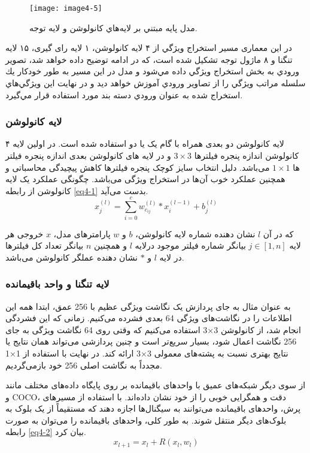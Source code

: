\begin{figure}[h]
\centering
  \texttt{[image: image4-5]}
  \caption{مدل پايه مبتني بر لايه‌هاي كانولوشن و لايه توجه.}
  \label{image4-5}
\end{figure}

\noindent
در این معماری مسير استخراج ويژگي از ۴ لايه كانولوشن، ۱ لایه رای گیری، ۱۵ لايه تنگنا   و ۸ ماژول توجه  تشکیل شده است، كه در ادامه توضيح داده خواهد شد، تصوير ورودي به بخش استخراج ويژگي داده مي‌شود و مدل در اين مسير به طور خودكار يك سلسله مراتب ويژگي را از تصاوير ورودي آموزش خواهد ديد و در نهايت اين ويژگي‌هاي استخراج شده به عنوان ورودي دسته بند مورد استفاده قرار مي‌گيرد.

\subsubsection{لايه كانولوشن}
۴ لایه کانولوشن دو بعدی همراه با گام یک یا دو استفاده شده است. در اولین لایه کانولوشن‌ اندازه پنجره فیلترها $3 \times 3$ و در لایه های کانولوشن بعدی اندازه پنجره فیلتر ها $1 \times 1$ می‌باشد. دلیل انتخاب سایز کوچک پنجره فیلترها کاهش پیچیدگی محاسباتی و همچنین عملکرد خوب آن‌ها در استخراج ویژگی می‌باشد. چگونگی عملکرد یک لایه کانولوشن از رابطه \ref{eq4-1} بدست می‌آید.
\begin{equation}	
x_j^{(l)} =\sum_{i=0}^{c} w_{c_{ij}}^{(l)}\ast x_i^{(l-1) }+ b_j^{(l)} 
\label{eq4-1}
\end{equation}

\noindent
که در آن $l$ نشان دهنده شماره لایه کانولوشن، $b$ و $w$ پارامترهای مدل، $x$ خروجی هر لایه $j\in[1,n]$ بیانگر شماره فیلتر موجود درلایه $l$ و همچنین $n$ بیانگر تعداد کل فیلترها در لایه $l$ و $\ast$ نشان دهنده عملگر کانولوشن می‌باشد.

\subsubsection{لایه تنگنا و واحد باقیمانده}
به عنوان مثال به جای پردازش یک نگاشت ویژگی عظیم با 256 عمق، ابتدا همه این اطلاعات را در نگاشت‌های ویژگی 64 بعدی فشرده می‌کنیم. زمانی که این فشردگی انجام شد، از کانولوشن 3×3 استفاده می‌کنیم که وقتی روی 64 نگاشت ویژگی به جای 256 نگاشت اعمال شود، بسیار سریع‌تر است و چنین پردازشی می‌تواند همان نتایج یا نتایج بهتری نسبت به پشته‌های معمولی 3×3 ارائه کند. در نهایت با استفاده از 1×1 مجدداً به نگاشت اصلی 256 خود بازمی‌گردیم.

\noindent
از سوی دیگر شبکه‌های عمیق با واحدهای باقیمانده  بر روی پایگاه داده‌های مختلف مانند   و COCO، دقت و همگرایی خوبی را از خود نشان داده‌اند. با استفاده از مسیرهای پرش، واحدهای باقیمانده می‌توانند به سیگنال‌ها اجازه دهند که مستقیماً از یک بلوک به بلوک‌های دیگر منتقل شوند. به طور کلی، واحدهای باقیمانده را می‌توان به صورت رابطه \ref{eq4-2} بیان کرد.
\begin{equation}
x_{l+1}=x_l+R(x_l ,w_l)
\label{eq4-2}
\end{equation}

